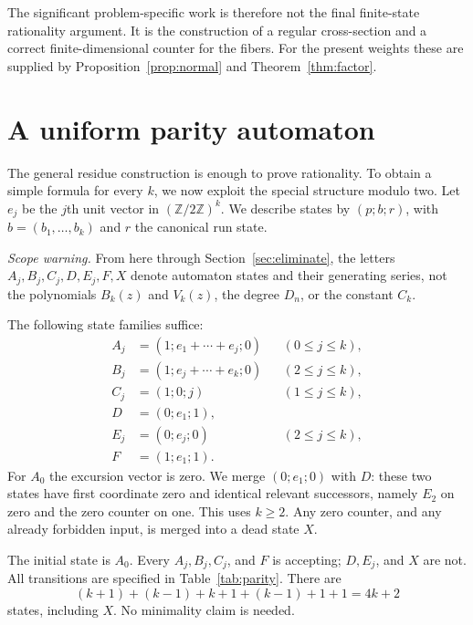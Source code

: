\documentclass[11pt,letterpaper]{article}
\numberwithin{equation}{section}
\theoremstyle{definition}
\theoremstyle{remark}
\newcommand{\Z}{\mathbb Z}
\begin{document}
The significant problem-specific work is therefore not the final
finite-state rationality argument. It is the construction of a regular
cross-section and a correct finite-dimensional counter for the fibers.
For the present weights these are supplied by
Proposition~\ref{prop:normal} and Theorem~\ref{thm:factor}.

\section{A uniform parity automaton}
\label{sec:parity}

The general residue construction is enough to prove rationality. To obtain
a simple formula for every $k$, we now exploit the special structure
modulo two. Let $e_j$ be the $j$th unit vector in $(\Z/2\Z)^k$.
We describe states by $(p;b;r)$, with $b=(b_1,\ldots,b_k)$ and $r$ the
canonical run state.

\emph{Scope warning.} From here through Section~\ref{sec:eliminate}, the
letters $A_j,B_j,C_j,D,E_j,F,X$ denote automaton states and their
generating series, not the polynomials $B_k(z)$ and $V_k(z)$, the degree
$D_n$, or the constant $C_k$.

The following state families suffice:
\begin{align*}
 A_j&=(1;e_1+\cdots+e_j;0) &&(0\le j\le k),\\
 B_j&=(1;e_j+\cdots+e_k;0) &&(2\le j\le k),\\
 C_j&=(1;0;j) &&(1\le j\le k),\\
 D&=(0;e_1;1),\\
 E_j&=(0;e_j;0) &&(2\le j\le k),\\
 F&=(1;e_1;1).
\end{align*}
For $A_0$ the excursion vector is zero. We merge $(0;e_1;0)$ with $D$:
these two states have first coordinate zero and identical relevant
successors, namely $E_2$ on zero and the zero counter on one. This uses
$k\ge2$. Any zero counter, and any already forbidden input, is merged
into a dead state $X$.

The initial state is $A_0$. Every $A_j,B_j,C_j$, and $F$ is accepting;
$D,E_j$, and $X$ are not. All transitions are specified in
Table~\ref{tab:parity}. There are
\[
 (k+1)+(k-1)+k+1+(k-1)+1+1=4k+2
\]
states, including $X$. No minimality claim is needed.
\end{document}
